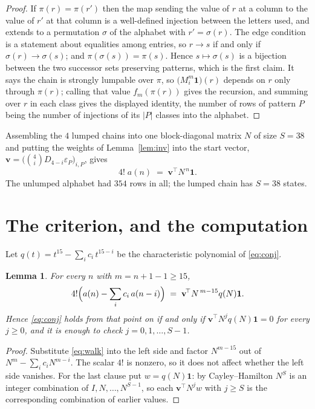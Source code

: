 \documentclass[11pt,a4paper]{article}
\theoremstyle{plain}
\newtheorem{lemma}[theorem]{Lemma}
\theoremstyle{definition}
\begin{document}
\begin{proof}
If $\pi(r)=\pi(r')$ then the map sending the value of $r$ at a column to the value of $r'$
at that column is a well-defined injection between the letters used, and extends to a
permutation $\sigma$ of the alphabet with $r'=\sigma(r)$. The edge condition is a statement
about equalities among entries, so $r\to s$ if and only if $\sigma(r)\to\sigma(s)$; and
$\pi(\sigma(s))=\pi(s)$. Hence $s\mapsto\sigma(s)$ is a bijection between the two successor
sets preserving patterns, which is the first claim. It says the chain is strongly lumpable
over $\pi$, so $\bigl(M_i^{m}\mathbf{1}\bigr)(r)$ depends on $r$ only through $\pi(r)$;
calling that value $f_m(\pi(r))$ gives the recursion, and summing over $r$ in each class
gives the displayed identity, the number of rows of pattern $P$ being the number of
injections of its $|P|$ classes into the alphabet.
\end{proof}

Assembling the $4$ lumped chains into one block-diagonal matrix $N$ of size $S=38$ and
putting the weights of Lemma~\ref{lem:inv} into the start vector,
$\mathbf{v}=\bigl(\binom{4}{i}D_{4-i}\varepsilon_P\bigr)_{i,P}$, gives
\begin{equation}\label{eq:walk}
4!\;a(n)\;=\;\mathbf{v}^{\!\top}N^{\,n}\mathbf{1} .
\end{equation}
The unlumped alphabet had $354$ rows in all; the lumped chain has $S=38$ states.

\section{The criterion, and the computation}

Let $q(t)=t^{15}-\sum_i c_i\,t^{15-i}$ be the characteristic polynomial of
\eqref{eq:conj}.

\begin{lemma}\label{lem:crit}
For every $n$ with $m=n+1-1\ge15$,
\[
4!\Bigl(a(n)-\sum_i c_i\,a(n-i)\Bigr)\;=\;\mathbf{v}^{\!\top}N^{\,m-15}q(N)\mathbf{1} .
\]
Hence \eqref{eq:conj} holds from that point on if and only if
$\mathbf{v}^{\!\top}N^{j}q(N)\mathbf{1}=0$ for every $j\ge0$, and it is enough to check
$j=0,1,\dots,S-1$.
\end{lemma}

\begin{proof}
Substitute \eqref{eq:walk} into the left side and factor $N^{m-15}$ out of
$N^{m}-\sum_i c_iN^{m-i}$. The scalar $4!$ is nonzero, so it does not affect whether
the left side vanishes. For the last clause put $w=q(N)\mathbf{1}$: by Cayley--Hamilton
$N^{S}$ is an integer combination of $I,N,\dots,N^{S-1}$, so each
$\mathbf{v}^{\!\top}N^{j}w$ with $j\ge S$ is the corresponding combination of earlier
values.
\end{proof}
\end{document}
